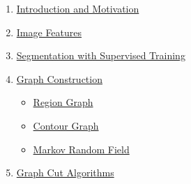 \documentclass[11pt, a4paper, landscape]{article}
\begin{document}
\TitlePage

\NewPage{}
\vfill
\begin{enumerate}
\item \hyperlink{sli:introduction}{Introduction and Motivation}
\item \hyperlink{sli:features}{Image Features}
\item \hyperlink{sli:supervised}{Segmentation with Supervised Training}
\item \hyperlink{sli:construction}{Graph Construction}
\begin{itemize}
	\item \hyperlink{sli:region_graph}{Region Graph}
	\item \hyperlink{sli:contour_graph}{Contour Graph}
	\item \hyperlink{sli:mrf}{Markov Random Field}
\end{itemize}
\item \hyperlink{sli:algorithms}{Graph Cut Algorithms}

\end{enumerate}
\end{document}
